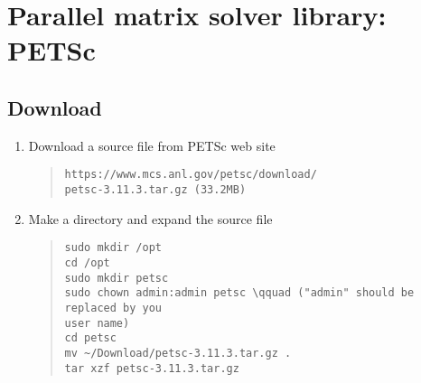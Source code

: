 \documentclass[11pt]{article}
\begin{document}
\section{Parallel matrix solver library: PETSc}

\subsection{Download}
\begin{enumerate}
\item
Download a source file from PETSc web site
\begin{quote}
\begin{verbatim}
https://www.mcs.anl.gov/petsc/download/
petsc-3.11.3.tar.gz (33.2MB)
\end{verbatim}
\end{quote}
\item
Make a directory and expand the source file
\begin{quote}
\begin{verbatim}
sudo mkdir /opt
cd /opt
sudo mkdir petsc
sudo chown admin:admin petsc \qquad ("admin" should be replaced by you
user name)
cd petsc
mv ~/Download/petsc-3.11.3.tar.gz .
tar xzf petsc-3.11.3.tar.gz
\end{verbatim}
\end{quote}
\end{enumerate}
\end{document}
